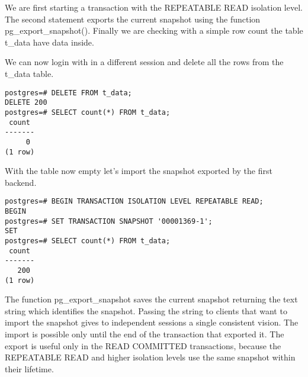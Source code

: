 We are first starting a transaction with the REPEATABLE READ isolation level. The second 
statement exports the current snapshot using the function pg\_export\_snapshot(). Finally we are 
checking with a simple row count the table t\_data have data inside.\newline

We can now login with in a different session and delete all the rows from the t\_data table.

\begin{lstlisting}[style=pgsql]
postgres=# DELETE FROM t_data;
DELETE 200
postgres=# SELECT count(*) FROM t_data;
 count 
-------
     0
(1 row)

\end{lstlisting}

With the table now empty let's import the snapshot exported by the first backend.

\begin{lstlisting}[style=pgsql]
postgres=# BEGIN TRANSACTION ISOLATION LEVEL REPEATABLE READ;
BEGIN
postgres=# SET TRANSACTION SNAPSHOT '00001369-1';
SET
postgres=# SELECT count(*) FROM t_data;
 count 
-------
   200
(1 row)

\end{lstlisting}

The function pg\_export\_snapshot saves the current snapshot returning the text string which 
identifies the snapshot. Passing the string to clients that want to import the snapshot gives to 
independent sessions a single consistent vision. The import is possible only until the end of the 
transaction that exported it. The export is useful only in the READ COMMITTED transactions, 
because the REPEATABLE READ and higher isolation levels use the same snapshot within their 
lifetime. 

